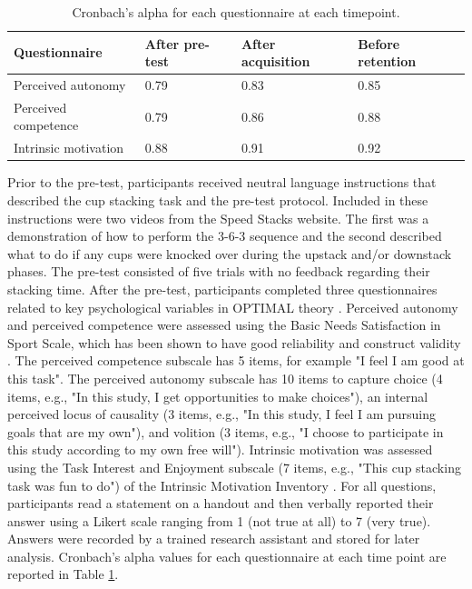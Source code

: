 \documentclass[man,floatsintext,donotrepeattitle,letterpaper,12pt]{apa7}
\begin{document}
\begin{table}[htb]
    \caption{Cronbach's alpha for each questionnaire at each timepoint.}
    \label{tab:table1}
    \small
    \begin{tabular}{@{}llll@{}}
    \toprule
    Questionnaire        & After pre-test & After acquisition & Before retention \\
    \midrule
    Perceived autonomy   & 0.79           & 0.83              & 0.85             \\
    Perceived competence & 0.79           & 0.86              & 0.88             \\
    Intrinsic motivation & 0.88           & 0.91              & 0.92             \\
    \bottomrule
    \end{tabular}
\end{table}

Prior to the pre-test, participants received neutral language instructions that described the cup stacking task and the pre-test protocol. Included in these instructions were two videos from the Speed Stacks website. The first was a demonstration of how to perform the 3-6-3 sequence and the second described what to do if any cups were knocked over during the upstack and/or downstack phases. The pre-test consisted of five trials with no feedback regarding their stacking time. After the pre-test, participants completed three questionnaires related to key psychological variables in OPTIMAL theory \autocite{wulf2016}. Perceived autonomy and perceived competence were assessed using the Basic Needs Satisfaction in Sport Scale, which has been shown to have good reliability and construct validity \autocite{ng2011}. The perceived competence subscale has 5 items, for example "I feel I am good at this task". The perceived autonomy subscale has 10 items to capture choice (4 items, e.g., "In this study, I get opportunities to make choices"), an internal perceived locus of causality (3 items, e.g., "In this study, I feel I am pursuing goals that are my own"), and volition (3 items, e.g., "I choose to participate in this study according to my own free will"). Intrinsic motivation was assessed using the Task Interest and Enjoyment subscale (7 items, e.g., "This cup stacking task was fun to do") of the Intrinsic Motivation Inventory \autocite{mcauley1989}. For all questions, participants read a statement on a handout and then verbally reported their answer using a Likert scale ranging from 1 (not true at all) to 7 (very true). Answers were recorded by a trained research assistant and stored for later analysis. Cronbach's alpha values for each questionnaire at each time point are reported in Table \ref{tab:table1}.
\end{document}
